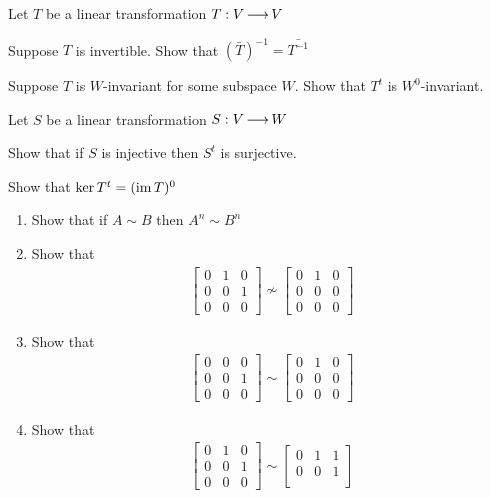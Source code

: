 \documentclass{amsart}
\begin{document}
	Let $T$ be a linear transformation $T: V \operatorname{\longrightarrow} V$

Suppose $T$ is invertible. Show that $(\bar T)^{-1} = \bar {T^{-1}} $

Suppose $T$ is $W$-invariant for some subspace $W$. Show that $T^t$ is $W^0$-invariant.

Let $S$ be a linear transformation $S: V \operatorname{\longrightarrow} W$

Show that if $S$ is injective then $S^t$ is surjective.

Show that $\ker T^t = (\operatorname{im} T)^0$

	\begin{enumerate}
		\item Show that if $A \sim B$ then $A^n \sim B^n$
		\item Show that 
		\begin{align*}
			\begin{bmatrix}
					0 & 1 & 0 \\
					0 & 0 & 1 \\
					0 & 0 & 0
			\end{bmatrix}
			\nsim 
			\begin{bmatrix}
					0 & 1 & 0 \\
					0 & 0 & 0 \\
					0 & 0 & 0
			\end{bmatrix}
		\end{align*}
		\item Show that 
		\begin{align*}
			\begin{bmatrix}
					0 & 0 & 0 \\
					0 & 0 & 1 \\
					0 & 0 & 0
			\end{bmatrix}
			\sim 
			\begin{bmatrix}
					0 & 1 & 0 \\
					0 & 0 & 0 \\
					0 & 0 & 0
			\end{bmatrix}
		\end{align*}		
		\item Show that 
		\begin{align*}
			\begin{bmatrix}
					0 & 1 & 0 \\
					0 & 0 & 1 \\
					0 & 0 & 0
			\end{bmatrix}
			\sim 
			\begin{bmatrix}
					0 & 1 & 1 \\
					0 & 0 & 1 \\

\end{bmatrix}
\end{align*}
\end{enumerate}
\end{document}
